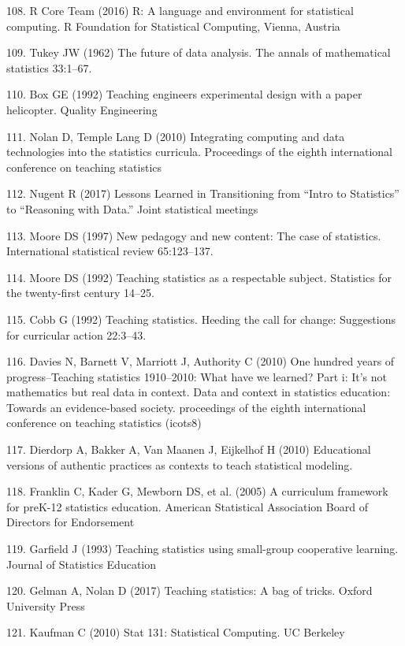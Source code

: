 \documentclass[12pt,twoside]{mitthesis-manusdown}
\begin{document}
\hypertarget{ref-rcite}{}
108. R Core Team (2016) R: A language and environment for statistical
computing. R Foundation for Statistical Computing, Vienna, Austria

\hypertarget{ref-tukey1962future}{}
109. Tukey JW (1962) The future of data analysis. The annals of
mathematical statistics 33:1--67.

\hypertarget{ref-box1992teaching}{}
110. Box GE (1992) Teaching engineers experimental design with a paper
helicopter. Quality Engineering

\hypertarget{ref-nolan2010integrating}{}
111. Nolan D, Temple Lang D (2010) Integrating computing and data
technologies into the statistics curricula. Proceedings of the eighth
international conference on teaching statistics

\hypertarget{ref-Nugent2017}{}
112. Nugent R (2017) Lessons Learned in Transitioning from ``Intro to
Statistics'' to ``Reasoning with Data.'' Joint statistical meetings

\hypertarget{ref-moore1997new}{}
113. Moore DS (1997) New pedagogy and new content: The case of
statistics. International statistical review 65:123--137.

\hypertarget{ref-moore1992teaching}{}
114. Moore DS (1992) Teaching statistics as a respectable subject.
Statistics for the twenty-first century 14--25.

\hypertarget{ref-cobb1992teaching}{}
115. Cobb G (1992) Teaching statistics. Heeding the call for change:
Suggestions for curricular action 22:3--43.

\hypertarget{ref-davies2010one}{}
116. Davies N, Barnett V, Marriott J, Authority C (2010) One hundred
years of progress--Teaching statistics 1910--2010: What have we learned?
Part i: It's not mathematics but real data in context. Data and context
in statistics education: Towards an evidence-based society. proceedings
of the eighth international conference on teaching statistics (icots8)

\hypertarget{ref-dierdorp2010educational}{}
117. Dierdorp A, Bakker A, Van Maanen J, Eijkelhof H (2010) Educational
versions of authentic practices as contexts to teach statistical
modeling.

\hypertarget{ref-franklin2005curriculum}{}
118. Franklin C, Kader G, Mewborn DS, et al. (2005) A curriculum
framework for preK-12 statistics education. American Statistical
Association Board of Directors for Endorsement

\hypertarget{ref-garfield1993teaching}{}
119. Garfield J (1993) Teaching statistics using small-group cooperative
learning. Journal of Statistics Education

\hypertarget{ref-gelman2017teaching}{}
120. Gelman A, Nolan D (2017) Teaching statistics: A bag of tricks.
Oxford University Press

\hypertarget{ref-Kaufman2010}{}
121. Kaufman C (2010) Stat 131: Statistical Computing. UC Berkeley


\end{document}
